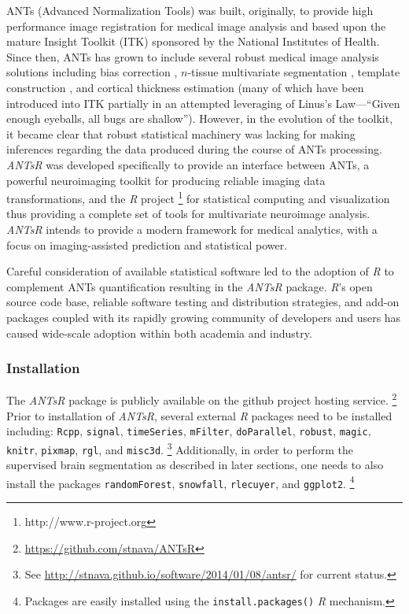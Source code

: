 \documentclass[preprint,authoryear,review,12pt]{elsarticle}
\begin{document}
ANTs (Advanced Normalization Tools) was built, originally, to provide 
high performance image registration for medical image analysis
\citep{avants2008a} and based upon the mature Insight Toolkit (ITK)
sponsored by the National Institutes of Health.  Since then, ANTs has grown to include 
several robust medical image analysis solutions including bias 
correction \citep{tustison2010}, $n$-tissue multivariate segmentation 
\citep{avants2011}, template construction \citep{avants2010}, and cortical 
thickness estimation \citep{das2009} (many of which have been
introduced into ITK partially in an attempted leveraging of Linus's Law---``Given enough eyeballs, all bugs are shallow'').  
However, in the evolution of the toolkit, it became clear 
that robust statistical machinery was lacking for making inferences regarding
the data produced during the course of ANTs processing.  \textit{ANTsR} was developed
specifically to provide an interface between ANTs, a 
powerful neuroimaging toolkit for producing reliable imaging data 
transformations, and the \textit{R} project%
\footnote{
http://www.r-project.org
}
for statistical computing and visualization thus providing a complete
set of tools for multivariate neuroimage analysis.  
 \textit{ANTsR} intends to provide a modern framework for medical analytics, 
 with a focus on imaging-assisted prediction and statistical power.


Careful consideration of available statistical software 
led to the adoption of \textit{R} to complement ANTs quantification resulting in the
\textit{ANTsR} package.
\textit{R}'s open source code base, reliable software testing and distribution strategies,
and add-on packages coupled with its rapidly growing 
community of developers and users has caused wide-scale
adoption within both academia and industry.

\subsubsection{Installation}

The \textit{ANTsR} package is publicly available on the github project hosting service.%
\footnote{
\href{https://github.com/stnava/ANTsR}{https://github.com/stnava/ANTsR}
}
Prior to installation of \textit{ANTsR}, several external \textit{R} packages
need to be installed including: \verb#Rcpp#, \verb#signal#, \verb#timeSeries#, 
\verb#mFilter#, \verb#doParallel#, \verb#robust#, \verb#magic#, \verb#knitr#, \verb#pixmap#, 
\verb#rgl#, and \verb#misc3d#.%
\footnote{
See \href{http://stnava.github.io/software/2014/01/08/antsr/}{http://stnava.github.io/software/2014/01/08/antsr/} for current status.}
Additionally, in order
to perform the supervised brain segmentation as described 
in later sections, one needs to also install the packages
\verb#randomForest#, \verb#snowfall#, \verb#rlecuyer#,
and \verb#ggplot2#.%
\footnote{
Packages are easily installed using the {\tt install.packages()} \textit{R} mechanism.
} 
\end{document}
